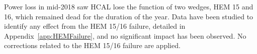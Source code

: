 Power loss in mid-2018 saw HCAL lose the function of two wedges, HEM 15 and 16, which remained dead for the duration of the year. Data have been studied to identify any effect from the HEM 15/16 failure, detailed in Appendix~\ref{app:HEMFailure}, and no significant impact has been observed. No corrections related to the HEM 15/16 failure are applied.